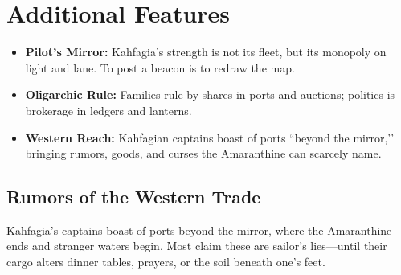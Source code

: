 \section*{Additional Features}
\begin{itemize}
\item \textbf{Pilot’s Mirror:} Kahfagia’s strength is not its fleet, but its monopoly on light and lane. To post a beacon is to redraw the map.
\item \textbf{Oligarchic Rule:} Families rule by shares in ports and auctions; politics is brokerage in ledgers and lanterns.
\item \textbf{Western Reach:} Kahfagian captains boast of ports ``beyond the mirror,’’ bringing rumors, goods, and curses the Amaranthine can scarcely name.
\end{itemize}

\subsection*{Rumors of the Western Trade}
\label{sec:kahfagia-rumors}

Kahfagia’s captains boast of ports beyond the mirror, where the Amaranthine ends and stranger waters begin. Most claim these are sailor’s lies—until their cargo alters dinner tables, prayers, or the soil beneath one’s feet.

